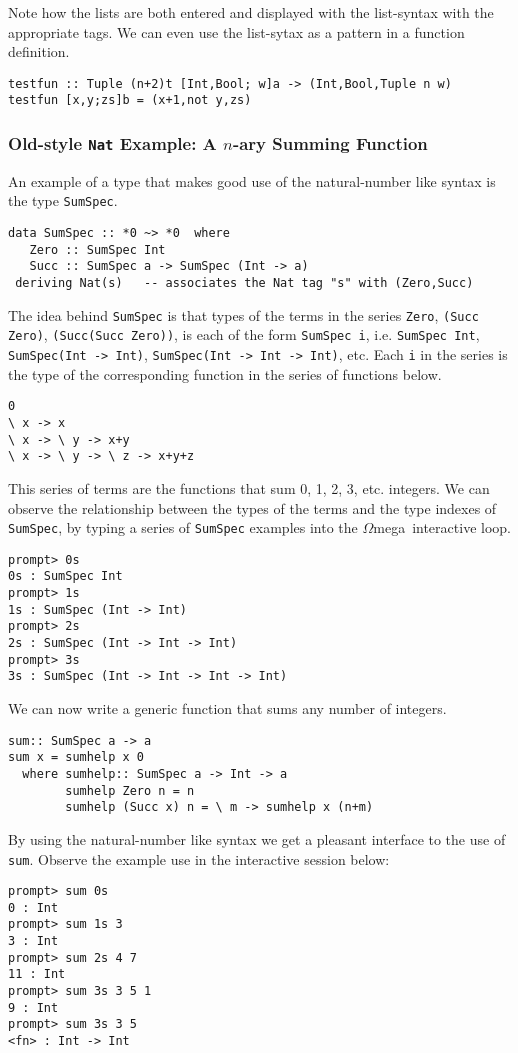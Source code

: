 \documentclass[11pt,twoside]{article}
\newcommand{\om}{$\Omega$mega}
\begin{document}
Note how the lists are both entered and displayed with
the list-syntax with the appropriate tags. We can even use the list-sytax
as a pattern in a function definition.

\begin{verbatim}
testfun :: Tuple (n+2)t [Int,Bool; w]a -> (Int,Bool,Tuple n w)
testfun [x,y;zs]b = (x+1,not y,zs)
\end{verbatim}

\subsubsection{Old-style {\tt Nat} Example: A $n$-ary Summing Function}

An example of a type that makes good
use of the natural-number like syntax is the type {\tt SumSpec}.

\begin{verbatim}
data SumSpec :: *0 ~> *0  where
   Zero :: SumSpec Int
   Succ :: SumSpec a -> SumSpec (Int -> a)
 deriving Nat(s)   -- associates the Nat tag "s" with (Zero,Succ)
\end{verbatim}
The idea behind {\tt SumSpec} is that types of the
terms in the series {\tt Zero},
{\tt (Succ Zero)}, {\tt (Succ(Succ Zero))}, is each
of the form {\tt SumSpec i}, i.e. {\tt SumSpec Int}, {\tt SumSpec(Int -> Int)},
{\tt SumSpec(Int -> Int -> Int)}, etc. Each {\tt i} in the series
is the type of the corresponding function in the series of functions below.
\begin{verbatim}
0
\ x -> x
\ x -> \ y -> x+y
\ x -> \ y -> \ z -> x+y+z
\end{verbatim}
This series of terms are the functions that sum 0, 1, 2, 3, etc. integers.
We can observe the relationship between the types of the terms and
the type indexes of {\tt SumSpec}, by typing a series of {\tt SumSpec} examples into the \om\ interactive loop.
\begin{verbatim}
prompt> 0s
0s : SumSpec Int
prompt> 1s
1s : SumSpec (Int -> Int)
prompt> 2s
2s : SumSpec (Int -> Int -> Int)
prompt> 3s
3s : SumSpec (Int -> Int -> Int -> Int)
\end{verbatim}
We can now write a generic function that sums any number of integers.

\begin{verbatim}
sum:: SumSpec a -> a
sum x = sumhelp x 0
  where sumhelp:: SumSpec a -> Int -> a
        sumhelp Zero n = n
        sumhelp (Succ x) n = \ m -> sumhelp x (n+m)
\end{verbatim}
By using the natural-number like syntax we get a pleasant interface to
the use of {\tt sum}. Observe the example use in the interactive session
below:
\begin{verbatim}
prompt> sum 0s
0 : Int
prompt> sum 1s 3
3 : Int
prompt> sum 2s 4 7
11 : Int
prompt> sum 3s 3 5 1
9 : Int
prompt> sum 3s 3 5
<fn> : Int -> Int
\end{verbatim}
\end{document}
